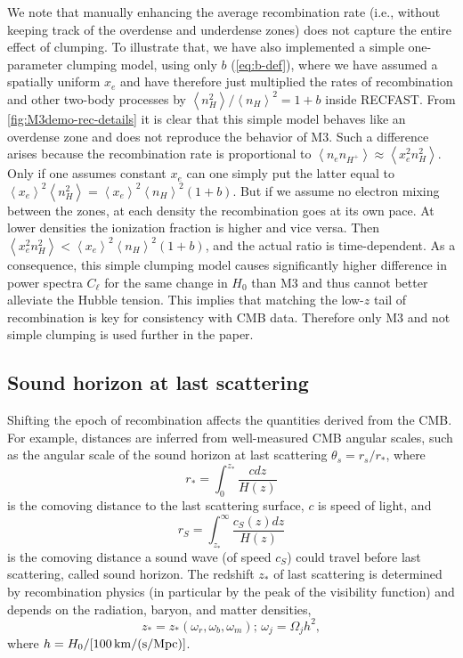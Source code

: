 We note that manually enhancing the average recombination rate (i.e., without keeping track of the overdense and underdense zones) does not capture the entire effect of clumping.
To illustrate that, we have also implemented a simple one-parameter clumping model, using only $b$ (\cref{eq:b-def}), where we have assumed a spatially uniform $x_e$ and have therefore just multiplied the rates of recombination and other two-body processes by $\left\langle n_H^2\right\rangle/\left\langle n_H\right\rangle^2=1+b$ inside RECFAST.
From \cref{fig:M3demo-rec-details} it is clear that  this simple model behaves like an overdense zone and does not reproduce the behavior of M3.
Such a difference arises because the recombination rate is proportional to $\left\langle n_en_{H^+}\right\rangle\approx \left\langle x_e^2n_H^2\right\rangle$.
Only if one assumes constant $x_e$ can one simply put the latter equal to $\left\langle x_e\right\rangle^2\left\langle n_H^2\right\rangle=\left\langle x_e\right\rangle^2\left\langle n_H\right\rangle^2\left(1+b\right)$.
But if we assume no electron mixing between the zones, at each density the recombination goes at its own pace.
At lower densities the ionization fraction is higher and vice versa.
Then $\left\langle x_e^2n_H^2\right\rangle<\left\langle x_e\right\rangle^2\left\langle n_H\right\rangle^2\left(1+b\right)$, and the actual ratio is time-dependent.
As a consequence, this simple clumping model causes significantly higher difference in power spectra $C_\ell$ for the same change in $H_0$ than M3 and thus cannot better alleviate the Hubble tension.
This implies that matching the low-$z$ tail of recombination is key for consistency with CMB data.
Therefore only M3 and not simple clumping is used further in the paper.


\subsection{Sound horizon at last scattering}

Shifting the epoch of recombination affects the quantities derived from the CMB.
For example, distances are inferred from well-measured CMB angular scales, such as the angular scale of the sound horizon at last scattering $\theta_s = r_s/r_*$, where
\begin{equation}
\label{eq:ls-distance}
r_* = \int_0^{z_*} \frac{cdz}{H\left( z \right)}
\end{equation}
is the comoving distance to the last scattering surface, $c$ is speed of light, and
\begin{equation}
\label{eq:ls-soundhor}
r_S = \int_{z_*}^\infty \frac{c_S\left( z \right)dz}{H\left( z \right)}
\end{equation}
is the comoving distance a sound wave (of speed $c_S$) could travel before last scattering, called sound horizon. 
The redshift $z_*$ of last scattering is determined by recombination physics (in particular by the peak of the visibility function) and depends on the radiation, baryon, and matter densities,
\begin{equation*}
z_* = z_*\left( \omega_r,\omega_b,\omega_m \right); \, \omega_j=\Omega_jh^2,
\end{equation*}
where $h=H_0/[100\,{\rm km/(s/Mpc)}]$.


